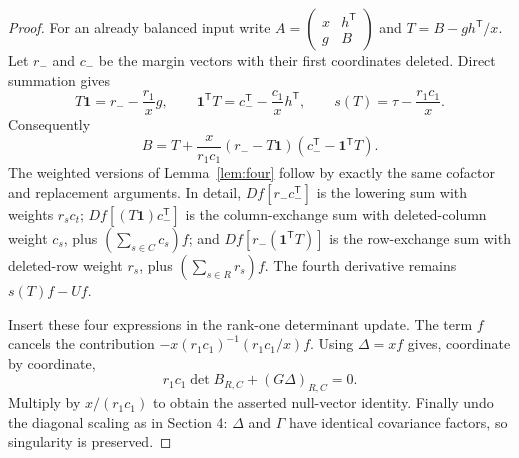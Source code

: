 \documentclass[11pt]{article}
\newcommand{\one}{\mathbf 1}
\begin{document}
\begin{proof}
For an already balanced input write $A=\left(\begin{smallmatrix}x&h^{\mathsf T}\\g&B\end{smallmatrix}\right)$ and $T=B-gh^{\mathsf T}/x$. Let $r_-$ and $c_-$ be the margin vectors with their first coordinates deleted. Direct summation gives
\[
 T\one=r_--\frac{r_1}{x}g,\qquad
 \one^{\mathsf T}T=c_-^{\mathsf T}-\frac{c_1}{x}h^{\mathsf T},\qquad
 s(T)=\tau-\frac{r_1c_1}{x}.
\]
Consequently
\[
 B=T+\frac{x}{r_1c_1}(r_--T\one)(c_-^{\mathsf T}-\one^{\mathsf T}T).
\]
The weighted versions of Lemma~\ref{lem:four} follow by exactly the same cofactor and replacement arguments. In detail, $Df[r_-c_-^{\mathsf T}]$ is the lowering sum with weights $r_s c_t$; $Df[(T\one)c_-^{\mathsf T}]$ is the column-exchange sum with deleted-column weight $c_s$, plus $(\sum_{s\in C}c_s)f$; and $Df[r_-(\one^{\mathsf T}T)]$ is the row-exchange sum with deleted-row weight $r_s$, plus $(\sum_{s\in R}r_s)f$. The fourth derivative remains $s(T)f-Uf$.

Insert these four expressions in the rank-one determinant update. The term $f$ cancels the contribution $-x(r_1c_1)^{-1}(r_1c_1/x)f$. Using $\Delta=xf$ gives, coordinate by coordinate,
\[
 r_1c_1\det B_{R,C}+(G\Delta)_{R,C}=0.
\]
Multiply by $x/(r_1c_1)$ to obtain the asserted null-vector identity. Finally undo the diagonal scaling as in Section 4: $\Delta$ and $\Gamma$ have identical covariance factors, so singularity is preserved.
\end{proof}
\end{document}
